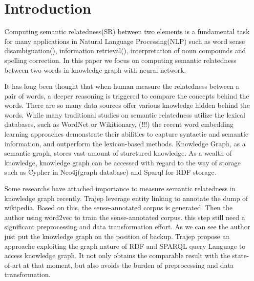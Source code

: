 \section{Introduction}
Computing semantic relatedness(SR) between two elements is a fundamental 
task for many applications in Natural Language Processing(NLP) such as 
word sense disambiguation(\cite{}), information retrieval(\cite{}), 
interpretation of noun compounds and spelling correction.  In this paper 
we focus on computing semantic relatedness between two words in knowledge 
graph with neural network.

It has long been thought that when human measure the relatedness between 
a pair of words, a deeper reasoning is triggered to compare the concepts 
behind the words. There are so many data sources offer various knowledge 
hidden behind the words. While many traditional studies on semantic relatedness 
utilize the lexical databases, such as WordNet or Wikitionary\cite{}, (!!!)
the recent word embedding learning approaches demonstrate their abilities 
to capture syntactic and semantic information, and outperform the 
lexicon-based methods\cite{}. Knowledge Graph, as a semantic graph, stores
vast amount of sturctured knowledge. As a wealth of knowledge, knowledge 
graph can be accessed with regard to the way of storage such as Cypher
in Neo4j(graph database) and Sparql for RDF storage.

Some researchs have attached importance to measure semantic relatedness
in knowledge graph\cite{REWORD, SenseEmbed} recently. Trajep\cite{SenseEmbed} 
leverage entity linking to annotate the dump of wikipedia. Based on this, 
the sense-annotated corpus is generated. Then the author using word2vec to 
train the sense-annotated corpus. this step still need a significant 
preprocessing and data transformation effort. As we can see the author 
just put the knowledge graph on the position of backup. Trajep \cite{REWORD}
propose an approache exploiting the graph nature of RDF and SPARQL query
Language to access knowledge graph. It not only obtains the comparable
result with the state-of-art at that moment, but also avoids the burden 
of preprocessing and data transformation. 

